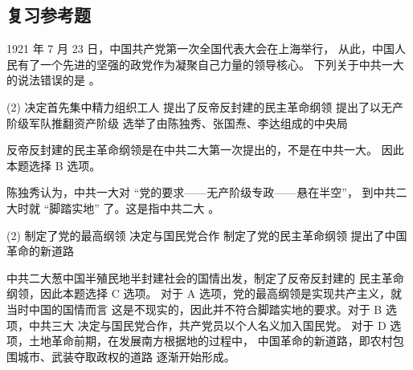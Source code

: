 \documentclass[10pt, UTF8]{book} %
\begin{document}
\subsection{复习参考题}

\begin{example}
    1921 年 7 月 23 日，中国共产党第一次全国代表大会在上海举行，
    从此，中国人民有了一个先进的坚强的政党作为凝聚自己力量的领导核心。
    下列关于中共一大的说法错误的是 \underline{\qquad \qquad \qquad}。
    \begin{tasks}[label={\Alph*.}](2)
        \task 决定首先集中精力组织工人
        \task 提出了反帝反封建的民主革命纲领
        \task 提出了以无产阶级军队推翻资产阶级
        \task 选举了由陈独秀、张国焘、李达组成的中央局
    \end{tasks}
    \begin{cmt}
        反帝反封建的民主革命纲领是在中共二大第一次提出的，不是在中共一大。
        因此本题选择 B 选项。
    \end{cmt}
\end{example}

\begin{example}
    陈独秀认为，中共一大对 “党的要求——无产阶级专政——悬在半空”，
    到中共二大时就 “脚踏实地” 了。这是指中共二大 \underline{\qquad \qquad \qquad}。
    \begin{tasks}[label={\Alph*.}](2)
        \task 制定了党的最高纲领
        \task 决定与国民党合作
        \task 制定了党的民主革命纲领
        \task 提出了中国革命的新道路
    \end{tasks}
    \begin{cmt}
        中共二大葱中国半殖民地半封建社会的国情出发，制定了反帝反封建的
        民主革命纲领，因此本题选择 C 选项。
        对于 A 选项，党的最高纲领是实现共产主义，就当时中国的国情而言
        这是不现实的，因此并不符合脚踏实地的要求。对于 B 选项，中共三大
        决定与国民党合作，共产党员以个人名义加入国民党。
        对于 D 选项，土地革命前期，在发展南方根据地的过程中，
        中国革命的新道路，即农村包围城市、武装夺取政权的道路
        逐渐开始形成。
    \end{cmt}
\end{example}


\end{document}
